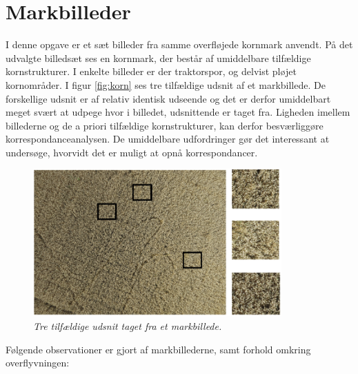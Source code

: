 \section{Markbilleder}
I denne opgave er et sæt billeder fra samme overfløjede kornmark anvendt. På det udvalgte billedsæt ses en kornmark, der består af umiddelbare tilfældige kornstrukturer. I enkelte billeder er der traktorspor, og delvist pløjet kornområder. I figur \eqref{fig:korn} ses tre tilfældige udsnit af et markbillede. De forskellige udsnit er af relativ identisk udseende og det er derfor umiddelbart meget svært at udpege hvor i billedet, udsnittende er taget fra. Ligheden imellem billederne og de a priori tilfældige kornstrukturer, kan derfor besværliggøre korrespondanceanalysen. De umiddelbare udfordringer gør det interessant at undersøge, hvorvidt det er muligt at opnå korrespondancer.
\begin{figure}[H]
    \centering
    \includegraphics[width=0.85\textwidth]{fig/20a.png}
    \begin{center}    
       \caption{{\footnotesize \textit{Tre tilfældige udsnit taget fra et markbillede.}}}
    \label{fig:korn}
     \end{center}
     \vspace{-2.5em}
  \end{figure} \noindent
Følgende observationer er gjort af markbillederne, samt forhold omkring overflyvningen:
